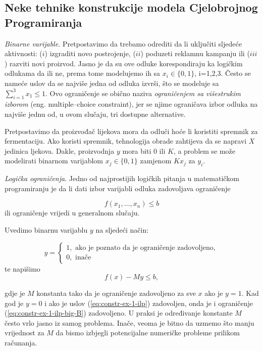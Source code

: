 \documentclass[a4paper, utf8, 11pt, colorlinks]{article}
\begin{document}
 \subsection{Neke tehnike konstrukcije modela Cjelobrojnog Programiranja}
 
 \emph{Binarne varijable.} Pretpostavimo da trebamo odrediti da li uključiti sljedeće aktivnosti: ($i$) izgraditi novo postrojenje,
($ii$) poduzeti reklamnu kampanju ili ($iii$) razviti novi proizvod. Jasno je da su ove odluke korespondiraju ka logičkim odlukama da ili ne, prema tome modelujemo ih sa  $x_i \in \{0, 1 \}$, i=1,2,3. Često se nameće uslov da se najviše jedna od odluka izvrši, što se modeluje sa $\sum_{i=1}^3 x_1 \leq 1$. Ovo ograničenje se obično naziva \emph{ograničenjem sa višestrukim izborom} (eng. multiple--choice constraint), jer se njime ograničava izbor odluka na najviše jednu od, u ovom slučaju, tri dostupne alternative. 


Pretpostavimo da proizvođač lijekova mora da odluči hoće li koristiti spremnik za fermentaciju. Ako koristi spremnik, tehnologija obrade zahtijeva da se napravi $X$ jedinica ljekova. Dakle, proizvodnja $y$ mora biti 0 ili $K$, a problem se može modelirati binarnom varijablom $x_j \in \{ 0, 1\}$ zamjenom $Kx_j$ za $y_i$. 

\emph{Logička ograničenja}. Jedno od najprostijih logičkih pitanja u matematičkom programiranju je da li dati izbor varijabli odluka zadovoljava ograničenje

\begin{equation}\label{eq:constr-ex-1-ilp}
   f(x_1,\ldots, x_n )\leq b
\end{equation}
 ili   ograničenje vrijedi u generalnom slučaju.
 
 Uvedimo binarnu varijablu $y$ na sljedeći način:
 
$$y =\begin{cases}
1, \mbox{ ako je poznato da je ograničenje zadovoljeno}, \\
0, \mbox{ inače}
\end{cases}$$
te napišimo 
\begin{equation}\label{eq:constr-ex-1-ilp-big-B}
   f(x) - M y \leq b,
\end{equation}

gdje je $M$ konstanta tako da je 
ograničenje zadovoljeno za sve $x$ ako je $y =1$. Kad god je $y=0$ i ako je uslov (\ref{eq:constr-ex-1-ilp}) zadovoljen, onda je i ograničenje (\ref{eq:constr-ex-1-ilp-big-B}) zadovoljeno. U praksi je određivanje konstante $M$ često vrlo jasno iz samog problema. Inače, veoma je bitno da uzmemo što manju vrijednost za $M$ da bismo izbjegli potencijalne numeričke probleme prilikom računanja. 
\end{document}

